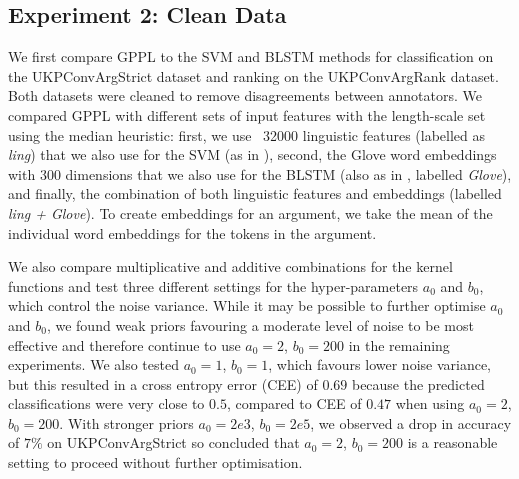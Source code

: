 \subsection{Experiment 2: Clean Data}

We first compare GPPL to the SVM and BLSTM methods for classification on the UKPConvArgStrict dataset and ranking on the UKPConvArgRank dataset. Both datasets were
cleaned to remove disagreements between annotators.
We compared GPPL with different sets of input features with the length-scale set using the median heuristic: first, we use ~32000 linguistic features (labelled as \emph{ling})
that we also use for the SVM (as in \cite{habernal2016argument}), second, the Glove 
word embeddings with 300 dimensions that we also use for the BLSTM (also as in \cite{habernal2016argument},
labelled \emph{Glove}),
and finally, the combination of both linguistic features and embeddings (labelled \emph{ling + Glove}). 
To create embeddings for an argument, we take the mean of the individual word embeddings for the tokens in the argument.

We also compare multiplicative and additive combinations for the kernel functions and
test three different settings for the hyper-parameters $a_0$ and $b_0$, which control
the noise variance. While it may be possible to further optimise $a_0$ and $b_0$,
we found weak priors favouring a moderate level of noise to be most
effective and therefore continue to use $a_0=2$, $b_0=200$ in the remaining experiments.
We also tested $a_0=1$, $b_0=1$, which favours lower noise variance, but this resulted in
a cross entropy error (CEE) of $0.69$ because the predicted classifications were very close to $0.5$, compared to CEE of $0.47$ when using $a_0=2$, $b_0=200$. With stronger
priors $a_0=2e3$, $b_0=2e5$, we observed a drop in accuracy of $7\%$ on UKPConvArgStrict so concluded that $a_0=2$, $b_0=200$ is a reasonable setting to proceed without further optimisation.

